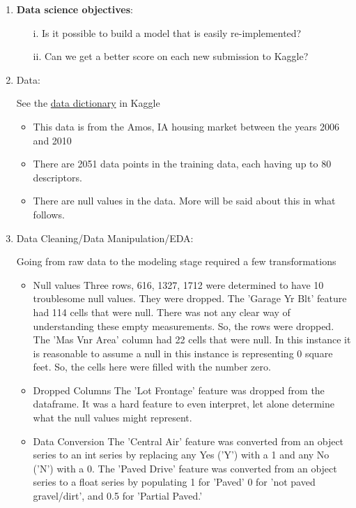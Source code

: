 \documentclass[10pt]{article}
\begin{document}
\begin{enumerate}[\null]

\item \textbf{Data science objectives}:
\begin{enumerate}
\item[i.] Is it possible to build a model that is easily re-implemented?
\item[ii.] Can we get a better score on each new submission to Kaggle?
\end{enumerate}
 


\item Data: 

\hspace{5mm} See the \href{https://www.kaggle.com/c/dsi-us-7-project-2-regression-challenge/data}	{data dictionary} in Kaggle

\begin{itemize}
\item This data is from the Amos, IA housing market between the years 2006 and 2010
\item There are 2051 data points in the training data, each having up to 80 descriptors.
\item There are null values in the data.  More will be said about this in what follows.
\end{itemize}


\item Data Cleaning/Data Manipulation/EDA: 

\hspace{5mm} Going from raw data to the modeling stage required a few transformations


\begin{itemize}
\item Null values
	\subitem Three rows, 616, 1327, 1712 were determined to have 10 troublesome null values.  They were dropped.  
	\subitem The 'Garage Yr Blt' feature had 114 cells that were null.  There was not any clear way of understanding these empty measurements.  So, the rows were dropped.
	\subitem The 'Mas Vnr Area' column had 22 cells that were null.  In this instance it is reasonable to assume a null in this instance is representing 0 square feet.  So, the cells here were filled with the number zero.
\item Dropped Columns
	\subitem The 'Lot Frontage' feature was dropped from the dataframe.  It was a hard feature to even interpret, let alone determine what the null values might represent.
	\item Data Conversion
	\subitem The 'Central Air' feature was converted from an object series to an int series by replacing any Yes ('Y') with a 1 and any No ('N') with a 0.
	\subitem The 'Paved Drive' feature was converted from an object series to a float series by populating 1 for 'Paved' 0 for 'not paved gravel/dirt', and 0.5 for 'Partial Paved.'
        

\end{itemize}
\end{enumerate}
\end{document}
